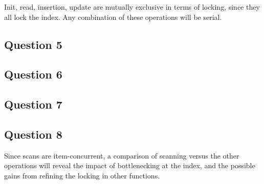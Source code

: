 \documentclass[11pt,a4paper]{article}
\begin{document}
Init, read, insertion, update are mutually exclusive in terms of locking, since
they all lock the index. Any combination of these operations will be serial.

\subsection{Question 5}




\subsection{Question 6}




\subsection{Question 7}



\subsection{Question 8}
Since scans are item-concurrent, a comparison of scanning versus the other operations
will reveal the impact of bottlenecking at the index, and the possible gains from refining the
locking in other functions.
\end{document}
